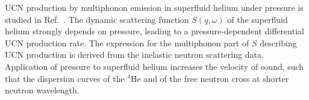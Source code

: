 
UCN production by multiphonon emission in superfluid helium under
pressure is studied in Ref.~\cite{Schmidt2009}.  The dynamic
scattering function $S(q,\omega)$ of the superfluid helium strongly
depends on pressure, leading to a pressure-dependent differential UCN
production rate. The expression for the multiphonon part of $S$
describing UCN production is derived from the inelastic neutron
scattering data.  Application of pressure to superfluid helium
increases the velocity of sound, such that the dispersion curves of
the $^4$He and of the free neutron cross at shorter neutron
wavelength.

